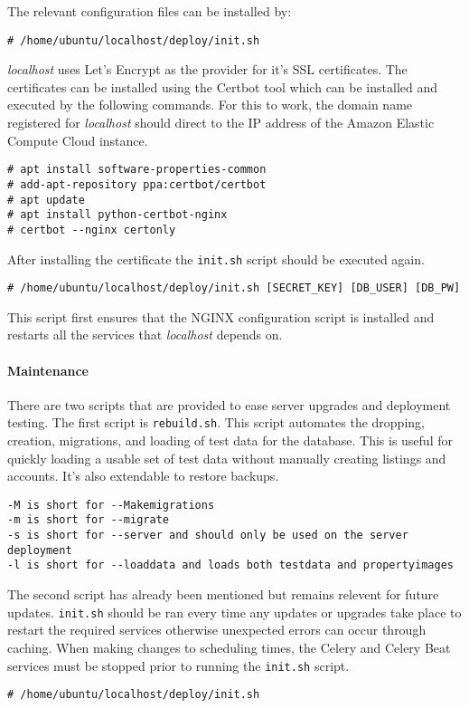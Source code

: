 The relevant configuration files can be installed by:
\begin{lstlisting}
# /home/ubuntu/localhost/deploy/init.sh
\end{lstlisting}
\emph{localhost} uses Let's Encrypt as the provider for it's SSL certificates.
The certificates can be installed using the Certbot tool which can be
installed and executed by the following commands. For this to work, the domain
name registered for \emph{localhost} should direct to the IP address of the
Amazon Elastic Compute Cloud instance.
\begin{lstlisting}
# apt install software-properties-common
# add-apt-repository ppa:certbot/certbot
# apt update
# apt install python-certbot-nginx
# certbot --nginx certonly
\end{lstlisting}
After installing the certificate the \lstinline{init.sh} script should be
executed again.
\begin{lstlisting}
# /home/ubuntu/localhost/deploy/init.sh [SECRET_KEY] [DB_USER] [DB_PW]
\end{lstlisting}
This script first ensures that the NGINX configuration script is installed
and restarts all the services that \emph{localhost} depends on.

\paragraph{Maintenance}

There are two scripts that are provided to ease server upgrades and deployment
testing. The first script is \lstinline{rebuild.sh}. This script automates the
dropping, creation, migrations, and loading of test data for the database.
This is useful for quickly loading a usable set of test data without manually
creating listings and accounts. It's also extendable to restore backups.
\begin{lstlisting}
-M is short for --Makemigrations
-m is short for --migrate
-s is short for --server and should only be used on the server deployment
-l is short for --loaddata and loads both testdata and propertyimages
\end{lstlisting}

The second script has already been mentioned but remains relevent for future
updates. \lstinline{init.sh} should be ran every time any updates or upgrades
take place to restart the required services otherwise unexpected errors can
occur through caching. When making changes to scheduling times, the Celery
and Celery Beat services must be stopped prior to running the
\lstinline{init.sh} script.
\begin{lstlisting}
# /home/ubuntu/localhost/deploy/init.sh
\end{lstlisting}
